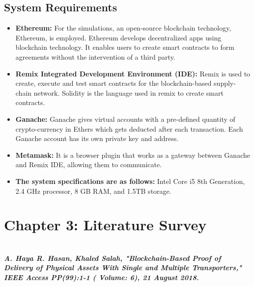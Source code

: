 \documentclass[12pt,a4paper,twocolumn,fleqn]{article}
\begin{document}
\subsection{System Requirements} 
\begin{itemize}
    \item \textbf{Ethereum:} For the simulations, an open-source blockchain technology, Ethereum, is employed. Ethereum develops decentralized apps using blockchain technology. It enables users to create smart contracts to form agreements without the intervention of a third party. 
    \item \textbf{Remix Integrated Development Environment (IDE):} Remix is used to create, execute and test smart contracts for the blockchain-based supply-chain network. Solidity is the language used in remix to create smart contracts.
    \item \textbf{Ganache:}  Ganache gives virtual accounts with a pre-defined quantity of crypto-currency in Ethers which gets deducted after each transaction. Each Ganache account has its own private key and address.
    \item \textbf{Metamask:} It is a browser plugin that works as a gateway between Ganache and Remix IDE, allowing them to communicate.
    \item \textbf{The system specifications are as follows:} Intel Core i5 8th Generation, 2.4 GHz processor, 8 GB RAM, and 1.5TB storage. 
\end{itemize}
\newpage
  \pagestyle{fancy}
  \thispagestyle{empty}
  \thispagestyle{plain}
  \fancyhf{}
  \chead{}
  \renewcommand{\headrulewidth}{0.4pt}%
\renewcommand{\footrulewidth}{0.4pt}%
\normalsize
\section{Chapter 3: Literature Survey} 
\hfill \\ 

\textbf{\emph {A. Haya R. Hasan, Khaled Salah, "Blockchain-Based Proof of Delivery of Physical Assets With Single and Multiple Transporters," IEEE Access PP(99):1-1 ( Volume: 6), 21 August 2018.}}
\end{document}
